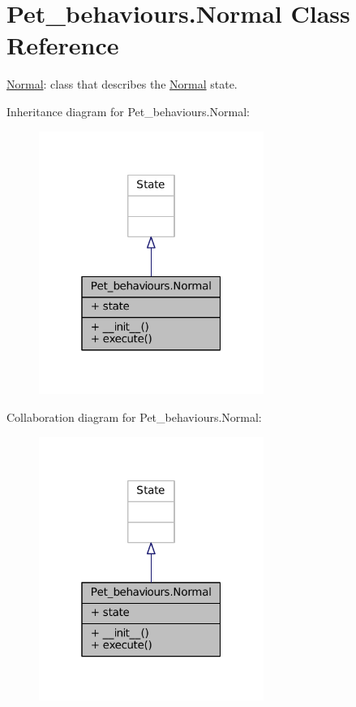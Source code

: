 \hypertarget{classPet__behaviours_1_1Normal}{}\section{Pet\+\_\+behaviours.\+Normal Class Reference}
\label{classPet__behaviours_1_1Normal}


\hyperlink{classPet__behaviours_1_1Normal}{Normal}\+: class that describes the \hyperlink{classPet__behaviours_1_1Normal}{Normal} state.  




Inheritance diagram for Pet\+\_\+behaviours.\+Normal\+:\nopagebreak
\begin{figure}[H]
\begin{center}
\leavevmode
\includegraphics[width=208pt]{classPet__behaviours_1_1Normal__inherit__graph}
\end{center}
\end{figure}


Collaboration diagram for Pet\+\_\+behaviours.\+Normal\+:\nopagebreak
\begin{figure}[H]
\begin{center}
\leavevmode
\includegraphics[width=208pt]{classPet__behaviours_1_1Normal__coll__graph}
\end{center}
\end{figure}
